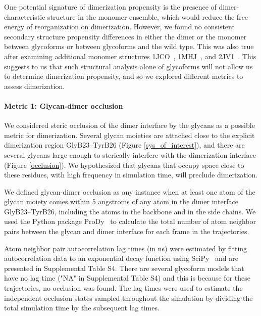 \documentclass[9pt]{elife}
\begin{document}
One potential signature of dimerization propensity is the presence of dimer-characteristic structure in the monomer ensemble, which would reduce the free energy of reorganization on dimerization. However, we found no consistent secondary structure propensity differences in either the dimer or the monomer between glycoforms or between glycoforms and the wild type. This was also true after examining additional monomer structures 1JCO~\cite{keller2001flexibility}, 1MHJ~\cite{jorgensen1996solution}, and 2JV1~\cite{bocian2008structure}. This suggests to us that such structural analysis alone of glycoforms will not allow us to determine dimerization propensity, and so we explored different metrics to assess dimerization.
\paragraph{Metric 1: Glycan-dimer occlusion}
We considered steric occlusion of the dimer interface by the glycans as a possible metric for dimerization. Several glycan moieties are attached close to the explicit dimerization region GlyB23--TyrB26 (Figure \ref{sys_of_interest}), and there are several glycans large enough to sterically interfere with the dimerization interface (Figure \ref{occlusion}). We hypothesized that glycans that occupy space close to these residues, with high frequency in simulation time, will preclude dimerization.

We defined glycan-dimer occlusion as any instance when at least one atom of the glycan moiety comes within 5 angstroms of any atom in the dimer interface GlyB23--TyrB26, including the atoms in the backbone and in the side chains. We used the Python package ProDy~\cite{bakan2011prody} to calculate the total number of atom neighbor pairs between the glycan and dimer interface for each frame in the trajectories.

Atom neighbor pair autocorrelation lag times (in ns) were estimated by fitting autocorrelation data to an exponential decay function using SciPy~\cite{scipy2020pub, numpy2020pub} and are presented in Supplemental Table S4. There are several glycoform models that have no lag time ("NA" in Supplemental Table S4) and this is because for these trajectories, no occlusion was found. The lag times were used to estimate the independent occlusion states sampled throughout the simulation by dividing the total simulation time by the subsequent lag times.
\end{document}
